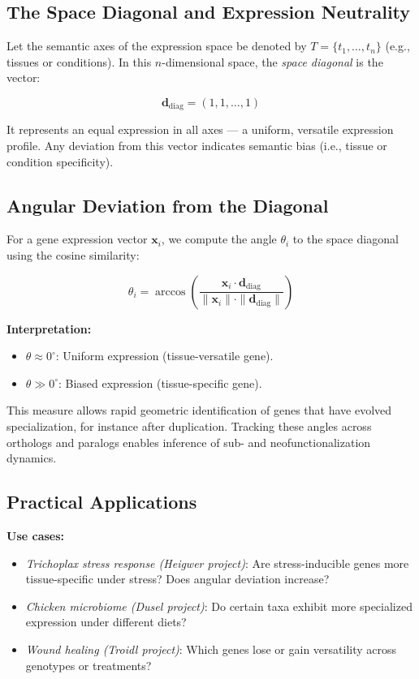\documentclass[11pt]{article}
\begin{document}
\subsection{The Space Diagonal and Expression Neutrality}

Let the semantic axes of the expression space be denoted by $T = \{t_1, \ldots, t_n\}$ (e.g., tissues or conditions). In this $n$-dimensional space, the \textit{space diagonal} is the vector:

\[
    \mathbf{d}_{\text{diag}} = (1, 1, \ldots, 1)
\]

It represents an equal expression in all axes — a uniform, versatile expression profile. Any deviation from this vector indicates semantic bias (i.e., tissue or condition specificity).

\subsection{Angular Deviation from the Diagonal}

For a gene expression vector $\mathbf{x}_i$, we compute the angle $\theta_i$ to the space diagonal using the cosine similarity:

\[
    \theta_i = \arccos\left( \frac{ \mathbf{x}_i \cdot \mathbf{d}_{\text{diag}} }{ \|\mathbf{x}_i\| \cdot \|\mathbf{d}_{\text{diag}}\| } \right)
\]

\textbf{Interpretation:}
\begin{itemize}[leftmargin=1.5em]
    \item $\theta \approx 0^\circ$: Uniform expression (tissue-versatile gene).
    \item $\theta \gg 0^\circ$: Biased expression (tissue-specific gene).
\end{itemize}

This measure allows rapid geometric identification of genes that have evolved specialization, for instance after duplication. Tracking these angles across orthologs and paralogs enables inference of sub- and neofunctionalization dynamics.

\subsection{Practical Applications}

\textbf{Use cases:}
\begin{itemize}[leftmargin=1.5em]
    \item \textit{Trichoplax stress response (Heigwer project)}: Are stress-inducible genes more tissue-specific under stress? Does angular deviation increase?
    \item \textit{Chicken microbiome (Dusel project)}: Do certain taxa exhibit more specialized expression under different diets?
    \item \textit{Wound healing (Troidl project)}: Which genes lose or gain versatility across genotypes or treatments?
\end{itemize}
\end{document}

